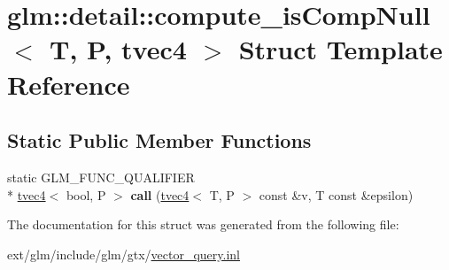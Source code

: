 \hypertarget{structglm_1_1detail_1_1compute__is_comp_null_3_01_t_00_01_p_00_01tvec4_01_4}{\section{glm\-:\-:detail\-:\-:compute\-\_\-is\-Comp\-Null$<$ T, P, tvec4 $>$ Struct Template Reference}
\label{structglm_1_1detail_1_1compute__is_comp_null_3_01_t_00_01_p_00_01tvec4_01_4}
}
\subsection*{Static Public Member Functions}
\begin{DoxyCompactItemize}
\item 
\hypertarget{structglm_1_1detail_1_1compute__is_comp_null_3_01_t_00_01_p_00_01tvec4_01_4_a6c98752b295461f1d83f44ecbb22aadf}{static G\-L\-M\-\_\-\-F\-U\-N\-C\-\_\-\-Q\-U\-A\-L\-I\-F\-I\-E\-R \\*
\hyperlink{structglm_1_1tvec4}{tvec4}$<$ bool, P $>$ {\bfseries call} (\hyperlink{structglm_1_1tvec4}{tvec4}$<$ T, P $>$ const \&v, T const \&epsilon)}\label{structglm_1_1detail_1_1compute__is_comp_null_3_01_t_00_01_p_00_01tvec4_01_4_a6c98752b295461f1d83f44ecbb22aadf}

\end{DoxyCompactItemize}


The documentation for this struct was generated from the following file\-:\begin{DoxyCompactItemize}
\item 
ext/glm/include/glm/gtx/\hyperlink{vector__query_8inl}{vector\-\_\-query.\-inl}\end{DoxyCompactItemize}
